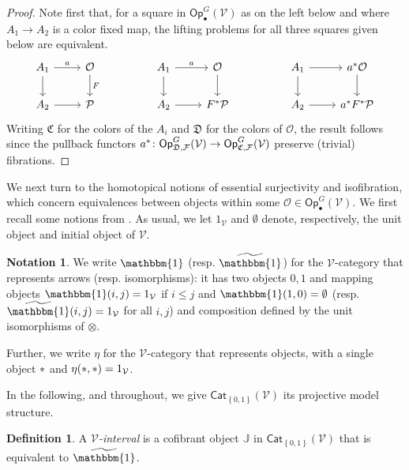 \documentclass[a4paper,10pt
 ,final
]{article}%
\numberwithin{equation}{section}
\numberwithin{figure}{section}
\theoremstyle{definition} %
\newtheorem{definition}[equation]{Definition}%
\newtheorem{notation}[equation]{Notation}%
\newcommand{\set}[1]{\left\{#1\right\}}%
\newcommand{\Cat}{\mathsf{Cat}}
\newcommand{\F}{\ensuremath{\mathcal F}}
\newcommand{\V}{\ensuremath{\mathcal V}}
\renewcommand{\O}{\ensuremath{\mathcal O}}
\renewcommand{\P}{\ensuremath{\mathcal P}}
\newcommand{\1}{\ensuremath{\mathbbm 1}}%
\begin{document}
\begin{proof}
Note first that,
for a square in $\mathsf{Op}^G_{\bullet}(\V)$
as on the left below and where $A_1 \to A_2$ is a color fixed map, 
the lifting problems for all three squares given below are equivalent.
\begin{equation}%
\begin{tikzcd}
A_1 \arrow[d] \arrow[r, "a"]
&
\mathcal{O} \arrow[d, "F"]
&&
A_1 \arrow[d] \arrow[r, "a"]
&
\mathcal{O} \arrow[d]
&&
A_1 \arrow[d] \arrow[r]
&
a^{\**} \mathcal{O} \arrow[d]
\\
A_2 \arrow[r]
&
\P
&&
A_2 \arrow[r]
&
F^{\**} \P
&&
A_2 \arrow[r]
&
a^{\**} F^{\**} \P
\end{tikzcd}
\end{equation}
Writing $\mathfrak{C}$ for the colors of the $A_i$ and
$\mathfrak{D}$ for the colors of $\O$,
the result follows since the pullback functors
$a^{\**} \colon \mathsf{Op}^G_{\mathfrak{D},\F}(\V)
\to \mathsf{Op}^G_{\mathfrak{C},\F}(\V)$
preserve (trivial) fibrations.
\end{proof}




We next turn to the homotopical notions of essential surjectivity and isofibration, 
which concern equivalences between objects within some 
$\O \in \mathsf{Op}^G_\bullet(\V)$.
We first recall some notions from \cite{BM13}.
As usual, we let $1_\V$ and $\emptyset$ denote, respectively, the unit object and initial object of $\V$.

\begin{notation}\label{1_NOT}
      We write $\mathbbm{1}$ (resp. $\widetilde{\mathbbm{1}}$)
      for the $\V$-category that represents arrows (resp. isomorphisms):
      it has two objects $0,1$
      and mapping objects
      $\mathbbm{1}(i,j)= 1_{\V}$
      if $i \leq j$
      and 
      $\mathbbm{1}(1,0)= \emptyset$
      (resp. $\widetilde{\mathbbm{1}}(i,j)= 1_{\V}$ for all $i,j$)
      and composition defined by the unit isomorphisms of $\otimes$.

      Further, we write $\eta$ for the $\V$-category that represents objects,
      with a single object $\**$ and $\eta(\**,\**) = 1_\V$.
\end{notation}


In the following, and throughout, 
we give $\Cat_{\set{0,1}}(\V)$
its projective model structure.

\begin{definition}\label{VINTER DEF}
      A {\em $\V$-interval} is a cofibrant object $\mathbb{J}$ in $\Cat_{\set{0,1}}(\V)$
      that is equivalent to $\widetilde{\mathbbm{1}}$.
\end{definition}
\end{document}
